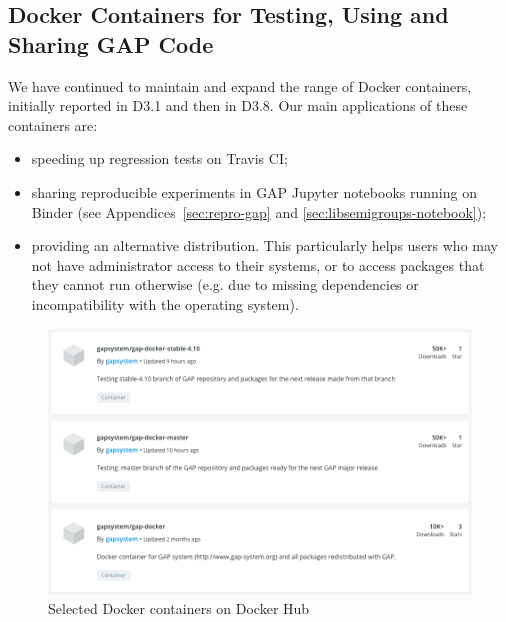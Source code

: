 %
%


\subsection{Docker Containers for Testing, Using and Sharing GAP Code}\label{docker}

We have continued to maintain and expand the range of Docker containers,
initially reported in D3.1 and then in D3.8. Our main applications of
these containers are:
\begin{itemize}
\item speeding up regression tests on Travis CI;
\item sharing reproducible experiments in GAP Jupyter notebooks running on
  Binder (see Appendices~\ref{sec:repro-gap} and
  \ref{sec:libsemigroups-notebook});
\item providing an alternative distribution.
This particularly helps users who may not have administrator access
  to their systems, or to access packages that they cannot run otherwise
  (e.g. due to missing dependencies or incompatibility with the operating system).
\end{itemize}

\begin{figure}[!ht]
    \centering
    \includegraphics[width=12cm]{images/gap-docker}
    \caption{Selected \GAP Docker containers on Docker Hub}
    \label{fig:gap-docker}
\end{figure}
 
